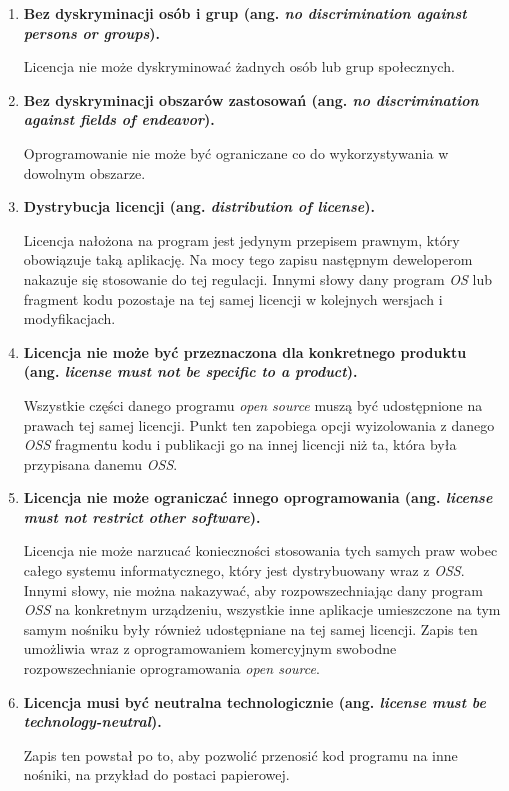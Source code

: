 \documentclass{article}
\begin{document}
\begin{enumerate}
    \item \textbf{Bez dyskryminacji osób i grup (ang. \emph{no discrimination against persons or groups}).}
    
    \hspace{4mm} Licencja nie może dyskryminować żadnych osób lub grup społecznych.
    
    \item \textbf{Bez dyskryminacji obszarów zastosowań (ang. \emph{no discrimination against fields of endeavor}).}
    
    \hspace{4mm} Oprogramowanie nie może być ograniczane co do wykorzystywania w dowolnym obszarze.
    
    \item \textbf{Dystrybucja licencji (ang. \emph{distribution of license}).}
    
    \hspace{4mm} Licencja nałożona na program jest jedynym przepisem prawnym, który obowiązuje taką aplikację. Na mocy tego zapisu następnym deweloperom nakazuje się stosowanie do tej regulacji. Innymi słowy dany program \emph{OS} lub fragment kodu pozostaje na tej samej licencji w kolejnych wersjach i modyfikacjach.
    
    \item \textbf{Licencja nie może być przeznaczona dla konkretnego produktu (ang. \emph{license must not be specific to a product}).}
    
    \hspace{4mm} Wszystkie części danego programu \emph{open source} muszą być udostępnione na prawach tej samej licencji. Punkt ten zapobiega opcji wyizolowania z danego \emph{OSS} fragmentu kodu i publikacji go na innej licencji niż ta, która była przypisana danemu \emph{OSS}.
    
    \item \textbf{Licencja nie może ograniczać innego oprogramowania (ang. \emph{license must not restrict other software}).}
    
    \hspace{4mm} Licencja nie może narzucać konieczności stosowania tych samych praw wobec całego systemu informatycznego, który jest dystrybuowany wraz z \emph{OSS}. Innymi słowy, nie można nakazywać, aby rozpowszechniając dany program \emph{OSS} na konkretnym urządzeniu, wszystkie inne aplikacje umieszczone na tym samym nośniku były również udostępniane na tej samej licencji. Zapis ten umożliwia wraz z oprogramowaniem komercyjnym swobodne rozpowszechnianie oprogramowania \emph{open source}.
    
    \item \textbf{Licencja musi być neutralna technologicznie (ang. \emph{license must be technology-neutral}).}
    
    \hspace{4mm} Zapis ten powstał po to, aby pozwolić przenosić kod programu na inne nośniki, na przykład do postaci papierowej.
\end{enumerate}
\end{document}

